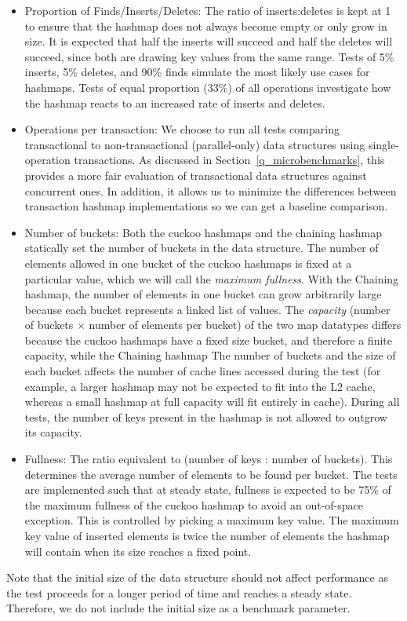 \begin{itemize}
    \item Proportion of Finds/Inserts/Deletes: The ratio of inserts:deletes is kept at 1 to ensure that the hashmap does not always become empty or only grow in size. It is expected that half the inserts will succeed and half the deletes will succeed, since both are drawing key values from the same range. Tests of 5\% inserts, 5\% deletes, and 90\% finds simulate the most likely use cases for hashmaps\cite{hm1}. Tests of equal proportion (33\%) of all operations investigate how the hashmap reacts to an increased rate of inserts and deletes.
    \item Operations per transaction: We choose to run all tests comparing transactional to non-transactional (parallel-only) data structures using single-operation transactions. As discussed in Section~\ref{q_microbenchmarks}, this provides a more fair evaluation of transactional data structures against concurrent ones. In addition, it allows us to minimize the differences between transaction hashmap implementations so we can get a baseline comparison.
    \item Number of buckets: Both the cuckoo hashmaps and the chaining hashmap statically set the number of buckets in the data structure. The number of elements allowed in one bucket of the cuckoo hashmaps is fixed at a particular value, which we will call the \emph{maximum fullness}. 
        With the Chaining hashmap, the number of elements in one bucket can grow arbitrarily large because each bucket represents a linked list of values.
        The \emph{capacity} (number of buckets $\times$ number of elements per bucket) of the two map datatypes differs because the cuckoo hashmaps have a fixed size bucket, and therefore a finite capacity, while the Chaining hashmap 
        The number of buckets and the size of each bucket affects the number of cache lines accessed during the test (for example, a larger hashmap may not be expected to fit into the L2 cache, whereas a small hashmap at full capacity will fit entirely in cache). During all tests, the number of keys present in the hashmap is not allowed to outgrow its capacity.
    \item Fullness: The ratio equivalent to (number of keys : number of buckets). This determines the average number of elements to be found per bucket. The tests are implemented such that at steady state, fullness is expected to be 75\% of the maximum fullness of the cuckoo hashmap to avoid an out-of-space exception. This is controlled by picking a maximum key value. The maximum key value of inserted elements is twice the number of elements the hashmap will contain when its size reaches a fixed point.
\end{itemize}
Note that the initial size of the data structure should not affect performance as the test proceeds for a longer period of time and reaches a steady state. Therefore, we do not include the initial size as a benchmark parameter.

